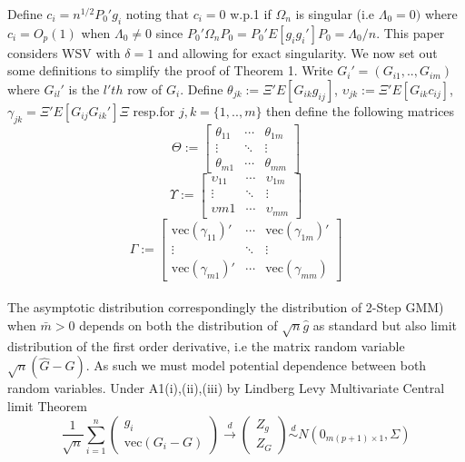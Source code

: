 \documentclass[11pt, fleqn]{article}
\begin{document}
Define $c_i=n^{1/2}P_0'g_i$ noting that $c_i=0$ w.p.1 if $\Omega_n$ is singular (i.e $\Lambda_0=0)$ where  $c_i=O_p(1)$ when $\Lambda_0\neq 0$ since $P_0'\Omega_nP_0=P_0'E[g_ig_i']P_0=\Lambda_0/n$. This paper considers WSV with $\delta=1$ and allowing for exact singularity. 
We now set out some definitions to simplify the proof of Theorem 1. Write $G_i'=(G_{i1},..,G_{im})$ where $G_{il}'$ is the $l'th$ row of $G_i$. Define  $\theta_{jk}:=\Xi' E[G_{ik}g_{ij}]$, $\upsilon_{jk}:=\Xi'E[G_{ik}c_{ij}]$, $\gamma_{jk}=\Xi' E[G_{ij}G_{ik}']\Xi$ resp.for $j,k=\{1,..,m\}$ then define the following matrices
\begin{equation}\label{theta} \Theta:=
\begin{bmatrix}
 \theta_{11} & \cdots & \theta_{1m}\\
\vdots & \ddots & \vdots   \\
  \theta_{m1} & \cdots&  \theta_{mm} \end{bmatrix}
\end{equation}
\begin{equation} \Upsilon:=
\begin{bmatrix}
 \upsilon_{11} & \cdots & \upsilon_{1m}\\
\vdots & \ddots & \vdots   \\
  \upsilon{m1} & \cdots&  \upsilon_{mm} \end{bmatrix}
\end{equation}
\begin{equation}\label{gamma}\Gamma:=
\begin{bmatrix}
 \textrm{vec}(\gamma_{11})' & \cdots & \textrm{vec}(\gamma_{1m})'\\
\vdots & \ddots & \vdots   \\
\textrm{vec}(\gamma_{m1})' & \cdots &  \textrm{vec}(\gamma_{mm})\end{bmatrix}\end{equation}\\
The asymptotic distribution correspondingly the distribution of 2-Step GMM) when $\bar{m}>0$ depends on both the distribution of $\sqrt{n}\hat{g}$ as standard but also limit distribution of the first order derivative, i.e the matrix random variable $\sqrt{n}(\hat{G}-G)$. As such we must model potential dependence between both random variables. Under A1(i),(ii),(iii) by Lindberg Levy Multivariate Central limit Theorem
  \begin{equation}  \frac{1}{\sqrt{n}}\sum_{i=1}^n\left( \begin{array}{c}g_i \\ \textrm{vec}(G_i-G)\end{array}\right)\overset{d}{\rightarrow}  \left( \begin{array}{c}Z_g \\ Z_G \end{array}\right) \overset{d}{\sim} N\left(0_{m(p+1)\times 1}, \Sigma\right)\end{equation}
\end{document}
